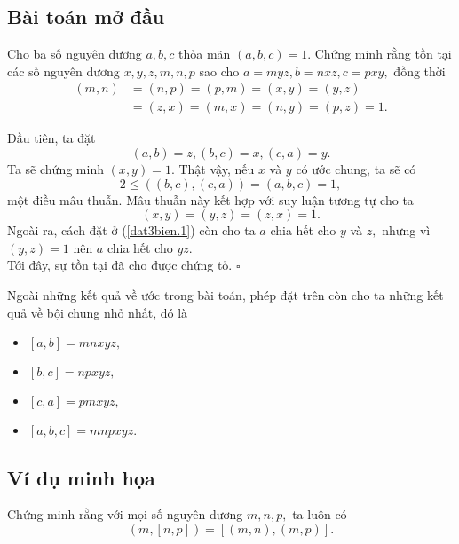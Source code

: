 \subsection*{Bài toán mở đầu} 
\begin{light}
 Cho ba số nguyên dương $a,b,c$ thỏa mãn $(a,b,c)=1.$ Chứng minh rằng tồn tại các số nguyên dương $x,y,z,m,n,p$ sao cho $a=myz,b=nxz,c=pxy,$ đồng thời
\begin{align*}
    (m,n)&=(n,p)=(p,m)=(x,y)=(y,z)\\&=(z,x)=(m,x)=(n,y)=(p,z)=1.
\end{align*}
\end{light}
Đầu tiên, ta đặt
\[(a,b)=z,(b,c)=x,(c,a)=y.\tag{*}\label{dat3bien.1}\]
Ta sẽ chứng minh $(x,y)=1.$ Thật vậy, nếu $x$ và $y$ có ước chung, ta sẽ có
$$2\le ((b,c),(c,a))=(a,b,c)=1,$$
một điều mâu thuẫn. Mâu thuẫn này kết hợp với suy luận tương tự cho ta
$$(x,y)=(y,z)=(z,x)=1.$$
Ngoài ra, cách đặt ở (\ref{dat3bien.1}) còn cho ta $a$ chia hết cho $y$ và $z,$ nhưng vì $(y,z)=1$ nên $a$ chia hết cho $yz.$ \\Tới đây, sự tồn tại đã cho được chứng tỏ. \hfill $\square$
\begin{luuy}
\nx Ngoài những kết quả về ước trong bài toán, phép đặt trên còn cho ta những kết quả về bội chung nhỏ nhất, đó là
\begin{multicols}{2}
\begin{itemize}
    \item $[a,b]=mnxyz,$
    \item $[b,c]=npxyz,$
    \item $[c,a]=pmxyz,$   
    \item $[a,b,c]=mnpxyz.$    
\end{itemize}
\end{multicols}
\end{luuy}

\subsection*{Ví dụ minh họa}
\begin{bx}
Chứng minh rằng với mọi số nguyên dương $m,n,p,$ ta luôn có
\[\left( m,\left[ n,p \right] \right)=\left[ \left( m,n \right),\left( m,p \right) \right].\]
\end{bx}

